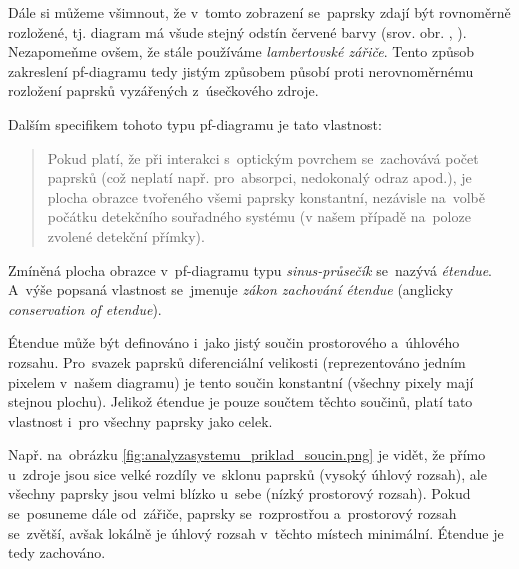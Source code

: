 
\beautypage

Dále si můžeme všimnout, že v~tomto zobrazení se~paprsky zdají být rovnoměrně rozložené, tj. diagram má všude stejný odstín červené barvy (srov. obr. , ). Nezapomeňme ovšem, že stále používáme \emph{lambertovské zářiče}. Tento způsob zakreslení pf-diagramu tedy jistým způsobem působí proti nerovnoměrnému rozložení paprsků vyzářených z~úsečkového zdroje.

Dalším specifikem tohoto typu pf-diagramu je tato vlastnost:

\begin{quote}
    Pokud platí, že při interakci s~optickým povrchem se~zachovává počet paprsků (což neplatí např. pro~absorpci, nedokonalý odraz apod.), je plocha obrazce tvořeného všemi paprsky konstantní, nezávisle na~volbě počátku detekčního souřadného systému (v našem případě na~poloze zvolené detekční přímky).
\end{quote}

Zmíněná plocha obrazce v~pf-diagramu typu \emph{sinus-průsečík} se~nazývá \emph{étendue}. A~výše popsaná vlastnost se~jmenuje \emph{zákon zachování étendue} (anglicky \emph{conservation of etendue}).\parencite{chaves2017introduction,mushaveck2022designing}

Étendue může být definováno i~jako jistý součin prostorového a~úhlového rozsahu. Pro~svazek paprsků diferenciální velikosti (reprezentováno jedním pixelem v~našem diagramu) je tento součin konstantní (všechny pixely mají stejnou plochu). Jelikož étendue je pouze součtem těchto součinů, platí tato vlastnost i~pro všechny paprsky jako celek.

Např. na~obrázku \ref{fig:analyzasystemu_priklad_soucin.png} je vidět, že přímo u~zdroje jsou sice velké rozdíly ve~sklo\-nu paprsků (vysoký úhlový rozsah), ale všechny paprsky jsou velmi blízko u~sebe (nízký prostorový rozsah). Pokud se~posuneme dále od~zářiče, paprsky se~rozprostřou a~prostorový rozsah se~zvětší, avšak lokálně je úhlový rozsah v~těchto místech minimální. Étendue je tedy zachováno.

